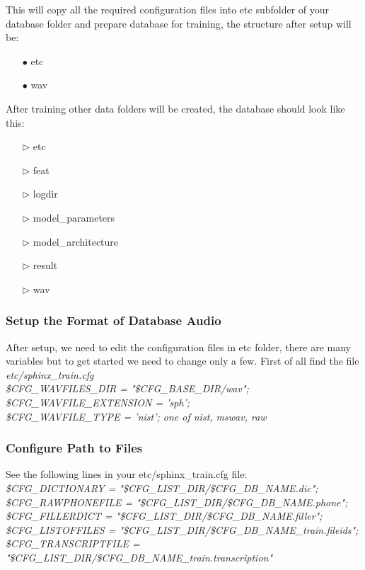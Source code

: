 \documentclass[12pt,a4paper,oneside]{memoir}
\begin{document}
This will copy all the required configuration files into etc subfolder of your database folder and prepare database for training, the structure after setup will be: 
\begin{itemize}
  \item[$\bullet$] etc
  \item[$\bullet$] wav
\end{itemize}

After training other data folders will be created, the database should look like this: 

\begin{itemize}
	
  \item[$\triangleright$] etc
  \item[$\triangleright$] feat 
  \item[$\triangleright$] logdir
  \item[$\triangleright$]model\_parameters
  \item[$\triangleright$]model\_architecture
  \item[$\triangleright$]result
  \item[$\triangleright$]wav
\end{itemize}


\subsubsection{Setup the Format of Database Audio}
After setup, we need to edit the configuration files in etc folder, there are many variables but to get started we need to change only a few. First of all find the file \textit{etc/sphinx\_train.cfg}\\
\textit{
\$CFG\_WAVFILES\_DIR = "\$CFG\_BASE\_DIR/wav";\\
\$CFG\_WAVFILE\_EXTENSION = 'sph';\\
\$CFG\_WAVFILE\_TYPE = 'nist';  one of nist, mswav, raw
}

\subsubsection{Configure Path to Files}
 See the following lines in your etc/sphinx\_train.cfg file:\\
\textit{ 
\$CFG\_DICTIONARY     = "\$CFG\_LIST\_DIR/\$CFG\_DB\_NAME.dic";\\
\$CFG\_RAWPHONEFILE   = "\$CFG\_LIST\_DIR/\$CFG\_DB\_NAME.phone";\\
\$CFG\_FILLERDICT     = "\$CFG\_LIST\_DIR/\$CFG\_DB\_NAME.filler";\\
\$CFG\_LISTOFFILES    = "\$CFG\_LIST\_DIR/\${CFG\_DB\_NAME}\_train.fileids";\\
\$CFG\_TRANSCRIPTFILE = "\$CFG\_LIST\_DIR/\${CFG\_DB\_NAME}\_train.transcription"
}
\end{document}
